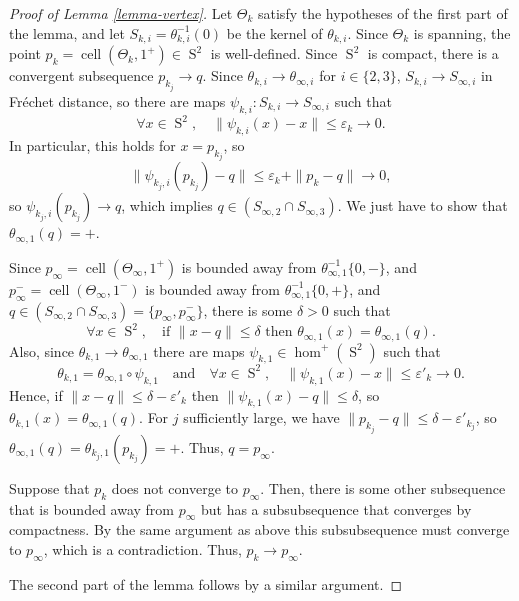 \documentclass[11pt]{article}
\numberwithin{equation}{section}
\newcommand{\quand}{\quad\text{and}\quad}
\theoremstyle{remark}
\let\eps\varepsilon
\DeclareMathOperator{\sphere}{S}
\DeclareMathOperator{\cell}{cell}
\begin{document}
\begin{proof}[Proof of Lemma \ref{lemma-vertex}]
Let $\Theta_k$ satisfy the hypotheses of the first part of the lemma, and let $S_{k,i} = \theta_{k,i}^{-1}(0)$ be the kernel of $\theta_{k,i}$.
Since $\Theta_k$ is spanning, the point $p_k = \cell(\Theta_k,1^+) \in \sphere^2$ is well-defined.
Since $\sphere^2$ is compact, there is a convergent subsequence $p_{k_j} \to q$.
Since $\theta_{k,i} \to \theta_{\infty,i}$ for $i \in \{2,3\}$, $S_{k,i} \to S_{\infty,i}$ in Fréchet distance, so there are maps $\psi_{k,i}:S_{k,i} \to S_{\infty,i}$ such that
\[
\forall x \in \sphere^2,\quad \|\psi_{k,i}(x)-x\| \leq \eps_k \to 0.
\]
In particular, this holds for $x=p_{k_j}$, so
\[
\| \psi_{k_j,i}(p_{k_j}) -q\| \leq \eps_k + \|p_k -q\| \to 0,
\]
so $\psi_{k_j,i}(p_{k_j}) \to q$, which implies $q \in (S_{\infty,2} \cap S_{\infty,3})$.
We just have to show that $\theta_{\infty,1}(q)=+$.

Since $p_\infty = \cell(\Theta_\infty,1^+)$ is bounded away from $\theta_{\infty,1}^{-1}\{0,-\}$, and $p^-_\infty = \cell(\Theta_\infty,1^-)$ is bounded away from $\theta_{\infty,1}^{-1}\{0,+\}$, and $q \in (S_{\infty,2} \cap S_{\infty,3}) = \{p_\infty,p^-_\infty\}$, there is some $\delta > 0$ such that
\[
\forall x \in \sphere^2,\quad\text{if }\|x-q\| \leq \delta\text{ then }\theta_{\infty,1}(x) = \theta_{\infty,1}(q).
\]
Also, since $\theta_{k,1} \to \theta_{\infty,1}$ there are maps $\psi_{k,1} \in \hom^+(\sphere^2)$ such that
\[
\theta_{k,1} = \theta_{\infty,1} \circ \psi_{k,1}\quand\forall x \in \sphere^2,\quad \|\psi_{k,1}(x) -x\| \leq \eps'_k \to 0.
\]
Hence, if $\|x-q\| \leq \delta -\eps'_k$ then $\|\psi_{k,1}(x)-q\| \leq \delta$, so $\theta_{k,1}(x) = \theta_{\infty,1}(q)$.
For $j$ sufficiently large, we have $\|p_{k_j} -q\| \leq \delta -\eps'_{k_j}$, so $\theta_{\infty,1}(q) = \theta_{k_j,1}(p_{k_j}) = +$. Thus, $q = p_\infty$.

Suppose that $p_k$ does not converge to $p_\infty$. Then, there is some other subsequence that is bounded away from $p_\infty$ but has a subsubsequence that converges by compactness. By the same argument as above this subsubsequence must converge to $p_\infty$, which is a contradiction. Thus, $p_k \to p_\infty$.

The second part of the lemma follows by a similar argument.
\end{proof}
\end{document}
